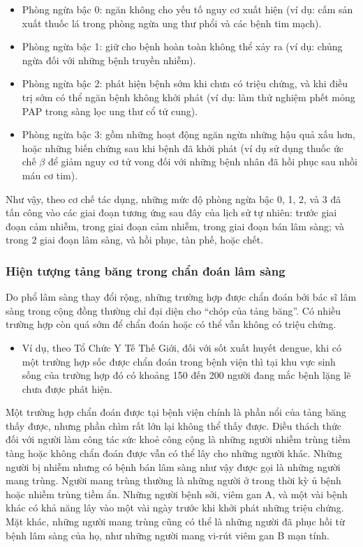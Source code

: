 \documentclass[
]{book}
\providecommand{\tightlist}{%
  \setlength{\itemsep}{0pt}\setlength{\parskip}{0pt}}
\begin{document}
\begin{itemize}
\tightlist
\item
  Phòng ngừa bậc 0: ngăn không cho yếu tố nguy cơ xuất hiện (ví dụ: cấm sản xuất thuốc lá trong phòng ngừa ung thư phổi và các bệnh tim mạch).
\item
  Phòng ngừa bậc 1: giữ cho bệnh hoàn toàn không thể xảy ra (ví dụ: chủng ngừa đối với những bệnh truyền nhiễm).
\item
  Phòng ngừa bậc 2: phát hiện bệnh sớm khi chưa có triệu chứng, và khi điều trị sớm có thể ngăn bệnh không khởi phát (ví dụ: làm thử nghiệm phết mỏng PAP trong sàng lọc ung thư cổ tử cung).
\item
  Phòng ngừa bậc 3: gồm những hoạt động ngăn ngừa những hậu quả xấu hơn, hoặc những biến chứng sau khi bệnh đã khởi phát (ví dụ sử dụng thuốc ức chế \(\beta\) để giảm nguy cơ tử vong đối với những bệnh nhân đã hồi phục sau nhồi máu cơ tim).
\end{itemize}

Như vậy, theo cơ chế tác dụng, những mức độ phòng ngừa bậc 0, 1, 2, và 3 đã tấn công vào các giai đoạn tương ứng sau đây của lịch sử tự nhiên: trước giai đoạn cảm nhiễm, trong giai đoạn cảm nhiễm, trong giai đoạn bán lâm sàng; và trong 2 giai đoạn lâm sàng, và hồi phục, tàn phế, hoặc chết.

\hypertarget{hiux1ec7n-tux1b0ux1ee3ng-tux1ea3ng-bux103ng-trong-chux1ea9n-ux111ouxe1n-luxe2m-suxe0ng}{%
\subsubsection{Hiện tượng tảng băng trong chẩn đoán lâm sàng}\label{hiux1ec7n-tux1b0ux1ee3ng-tux1ea3ng-bux103ng-trong-chux1ea9n-ux111ouxe1n-luxe2m-suxe0ng}}

Do phổ lâm sàng thay đổi rộng, những trường hợp được chẩn đoán bởi bác sĩ lâm sàng trong cộng đồng thường chỉ đại diện cho ``chóp của tảng băng''. Có nhiều trường hợp còn quá sớm để chẩn đoán hoặc có thể vẫn không có triệu chứng.

\begin{itemize}
\tightlist
\item
  Ví dụ, theo Tổ Chức Y Tế Thế Giới, đối với sốt xuất huyết dengue, khi có một trường hợp sốc được chẩn đoán trong bệnh viện thì tại khu vực sinh sống của trường hợp đó có khoảng 150 đến 200 người đang mắc bệnh lặng lẽ chưa được phát hiện.
\end{itemize}

Một trường hợp chẩn đoán được tại bệnh viện chính là phần nổi của tảng băng thấy được, nhưng phần chìm rất lớn lại không thể thấy được. Điều thách thức đối với người làm công tác sức khoẻ công cộng là những người nhiễm trùng tiềm tàng hoặc không chẩn đoán được vẫn có thể lây cho những người khác. Những người bị nhiễm nhưng có bệnh bán lâm sàng như vậy được gọi là những người mang trùng. Người mang trùng thường là những người ở trong thời kỳ ủ bệnh hoặc nhiễm trùng tiềm ẩn. Những người bệnh sởi, viêm gan A, và một vài bệnh khác có khả năng lây vào một vài ngày trước khi khởi phát những triệu chứng. Mặt khác, những người mang trùng cũng có thể là những người đã phục hồi từ bệnh lâm sàng của họ, như những người mang vi-rút viêm gan B mạn tính.
\end{document}

